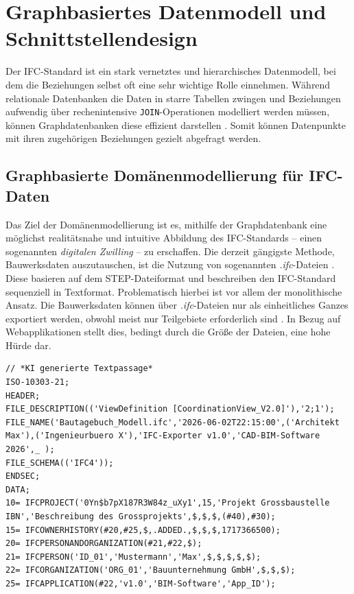 \section{Graphbasiertes Datenmodell und Schnittstellendesign} \label{sec:graphdatabase}
Der IFC-Standard ist ein stark vernetztes und hierarchisches Datenmodell, bei dem die Beziehungen selbst oft eine sehr wichtige Rolle einnehmen. Während relationale Datenbanken die Daten in starre Tabellen zwingen und Beziehungen
aufwendig über rechenintensive \texttt{JOIN}-Operationen modelliert werden müssen, können Graphdatenbanken diese effizient darstellen \cite[Kap.~2.2.3]{avgoren}. Somit können Datenpunkte mit ihren zugehörigen Beziehungen gezielt abgefragt werden.
\subsection{Graphbasierte Domänenmodellierung für IFC-Daten}
Das Ziel der Domänenmodellierung ist es, mithilfe der Graphdatenbank eine möglichst realitätsnahe und intuitive Abbildung des IFC-Standards – einen sogenannten \textit{digitalen Zwilling} – zu erschaffen.
Die derzeit gängigste Methode, Bauwerksdaten auszutauschen, ist die Nutzung von sogenannten \textit{.ifc}-Dateien \cite[Kap.~2.1]{avgoren}. Diese basieren auf dem \gls{STEP}-Dateiformat und beschreiben den IFC-Standard sequenziell in Textformat. Problematisch hierbei ist vor allem der monolithische Ansatz. Die Bauwerksdaten können über \textit{.ifc}-Dateien nur als einheitliches Ganzes exportiert werden, obwohl meist nur Teilgebiete erforderlich sind \cite{wolf_20206_graphql}. In Bezug auf Webapplikationen stellt dies, bedingt durch die Größe der Dateien, eine hohe Hürde dar.
\begin{lstlisting}[language=IFC, caption={Beispielhafter IFC-Datenauszug im STEP-Dateiformat (ISO 10303-21).}, label={lst:ifc_step_example}]
// *KI generierte Textpassage*
ISO-10303-21;
HEADER;
FILE_DESCRIPTION(('ViewDefinition [CoordinationView_V2.0]'),'2;1');
FILE_NAME('Bautagebuch_Modell.ifc','2026-06-02T22:15:00',('Architekt Max'),('Ingenieurbuero X'),'IFC-Exporter v1.0','CAD-BIM-Software 2026',_ );
FILE_SCHEMA(('IFC4'));
ENDSEC;
DATA;
10= IFCPROJECT('0Yn$b7pX187R3W84z_uXy1',15,'Projekt Grossbaustelle IBN','Beschreibung des Grossprojekts',$,$,$,(#40),#30);
15= IFCOWNERHISTORY(#20,#25,$,.ADDED.,$,$,$,1717366500);
20= IFCPERSONANDORGANIZATION(#21,#22,$);
21= IFCPERSON('ID_01','Mustermann','Max',$,$,$,$,$);
22= IFCORGANIZATION('ORG_01','Bauunternehmung GmbH',$,$,$);
25= IFCAPPLICATION(#22,'v1.0','BIM-Software','App_ID');
\end{lstlisting}
